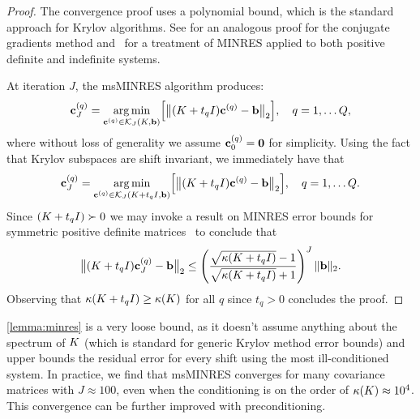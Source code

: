 \begin{proof}
  The convergence proof uses a polynomial bound, which is the standard approach for Krylov algorithms.
  See \citep[e.g.][]{shewchuk1994introduction,trefethen1997numerical,saad2003iterative} for an analogous proof for the conjugate gradients method and~\citep[e.g.][]{greenbaum1997iterative} for a treatment of MINRES applied to both positive definite and indefinite systems.

	At iteration $J$, the msMINRES algorithm produces:
	\begin{align}
    \mathbf{c}^{(q)}_J
    = \operatorname*{arg\,min}_{\mathbf{c}^{(q)} \in \mathcal{K}_J(K, \mathbf{b})} \Bigl[
      \bigl\Vert (K + t_q I) \mathbf{c}^{(q)} - \mathbf{b} \bigr\Vert_2
    \Bigr],
    \quad
    q = 1, \ldots Q,
    \label{eqn:minres_krylov}
	\end{align}
  where without loss of generality we assume $\mathbf{c}_0^{(q)} = \mathbf{0}$ for simplicity.
  Using the fact that Krylov subspaces are shift invariant, we immediately have that
  \begin{align}
    \mathbf{c}^{(q)}_J
    = \operatorname*{arg\,min}_{\mathbf{c}^{(q)} \in \mathcal{K}_J(K+t_q I, \mathbf{b})} \Bigl[
      \bigl\Vert (K + t_q I) \mathbf{c}^{(q)} - \mathbf{b} \bigr\Vert_2
    \Bigr],
    \quad
    q = 1, \ldots Q.
    \label{eqn:minres_krylov}
  \end{align}
  Since $(K + t_q I)\succ 0$ we may invoke a result on MINRES error bounds for symmetric positive definite matrices~\citep[Chapter 3]{greenbaum1997iterative} to conclude that
  \[
    \bigl\Vert (K + t_q I) \mathbf{c}_J^{(q)} - \mathbf{b} \bigr\Vert_2
    \leq \left( \frac{
      \sqrt{\kappa(K + t_q I)} - 1
    }{
      \sqrt{\kappa(K + t_q I)} + 1
    }\right)^J
    \Vert \mathbf{b} \Vert_2.
  \]
  Observing that $\kappa(K + t_q I) \geq \kappa(K)$ for all $q$ since $t_q > 0$ concludes the proof.
\end{proof}
%
\noindent
\cref{lemma:minres} is a very loose bound, as it doesn't assume anything about the spectrum of $K$ (which is standard for generic Krylov method error bounds) and upper bounds the residual error for every shift using the most ill-conditioned system.
In practice, we find that msMINRES converges for many covariance matrices with $J \approx 100$, even when the conditioning is on the order of $\kappa(K) \approx 10^4$.
This convergence can be further improved with preconditioning.


